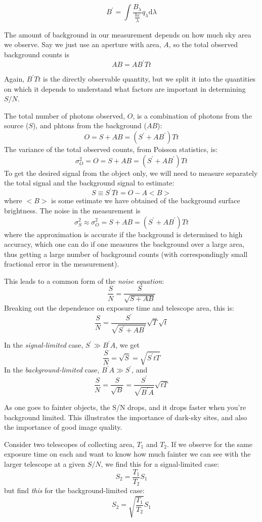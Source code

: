 \documentclass[12pt]{article}
\begin{document}
    $$ B^{\prime} = \int \frac{B_{\lambda}}{\frac{hc}{\lambda}}
       q_{\lambda}\textrm{d}\lambda $$

The amount of background in our measurement depends on
how much sky area we observe. Say we just
use an aperture with area, $A$, so the total observed background counts
is
    $$ AB = AB^{\prime}Tt $$

Again, $B^{\prime}Tt$ is the directly observable quantity,
but we split it into the quantities on which it depends to understand
what factors are important in determining $S/N$.

The total number of photons observed, $O$, is a combination of
photons from the source ($S$), and phtons from the background ($AB$):
    $$ O = S + AB = (S^{\prime} + AB^{\prime})Tt $$
The variance of the total observed counts, from Poisson statistics,
is:
    $$ \sigma^2_O = O =  S + AB = (S^{\prime} + AB^{\prime})Tt $$
To get the desired signal from the object only, we will need to
measure separately the total signal and the background signal to
estimate:
    $$ S \equiv S^{\prime}Tt = O-A <B> $$
where $<B>$ is some estimate we have obtained of the background
surface brightness. The noise in the measurement is
    $$ \sigma^2_S \approx \sigma^2_O =
    S + AB = (S^{\prime} + AB^{\prime})Tt $$
where the approximation is accurate if the background is determined to
high accuracy, which one can do if one measures the background over a
large area, thus getting a large number of background counts (with
correspondingly small fractional error in the measurement).

This leads to a common form of the \emph{noise equation}:
    $$ \frac{S}{N} = \frac{S}{\sqrt{S+AB}}  $$
Breaking out the dependence on exposure time and telescope area, this
is:
    $$ \frac{S}{N} = \frac{S^{\prime}}
    {\sqrt{S^{\prime}+AB^{\prime}}}
    \sqrt{T}\sqrt{t}$$

In the \emph{signal-limited} case, $S^{\prime}\gg B^{\prime}A$,
we get
$$ \frac{S}{N} = \sqrt{S} = \sqrt{S^{\prime}tT} $$
In the \emph{background-limited} case, $B^{\prime}A\gg S^{\prime}$,
and
$$ \frac{S}{N} = \frac{S}{\sqrt{B}} =
   \frac{S^{\prime}}{\sqrt{B^{\prime}A}}\sqrt{tT} $$

As one goes to fainter objects, the S/N drops, and it drops faster
when you're background limited. This illustrates the importance of
dark-sky sites, and also the importance of good image quality.

Consider two telescopes of collecting area, $T_1$ and $T_2$.
If we observe for the same exposure time on each and want to know how
much fainter we can see with the larger telescope at a given $S/N$, we
find this for a signal-limited case:
$$ S_2 = \frac{T_1}{T_2}S_1 $$
but find \emph{this} for the background-limited case:
$$ S_2 = \sqrt{\frac{T_1}{T_2}}S_1  $$
\end{document}
